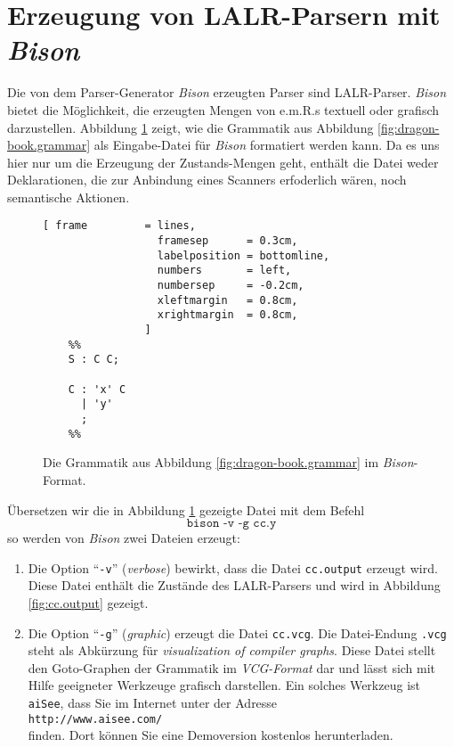 \section{Erzeugung von LALR-Parsern mit \textsl{Bison}}
Die von dem Parser-Generator \textsl{Bison} erzeugten Parser sind LALR-Parser.
\textsl{Bison} bietet die M\"oglichkeit, die erzeugten Mengen von e.m.R.s textuell oder
grafisch darzustellen.  Abbildung \ref{fig:cc.y} zeigt, wie die Grammatik aus Abbildung
\ref{fig:dragon-book.grammar} als Eingabe-Datei f\"ur \textsl{Bison} formatiert werden kann.
Da es uns hier nur um die Erzeugung der Zustands-Mengen geht, enth\"alt die Datei weder
Deklarationen, die zur Anbindung eines Scanners erfoderlich w\"aren, noch semantische Aktionen.

\begin{figure}[!ht]
\centering
\begin{Verbatim}[ frame         = lines, 
                  framesep      = 0.3cm, 
                  labelposition = bottomline,
                  numbers       = left,
                  numbersep     = -0.2cm,
                  xleftmargin   = 0.8cm,
                  xrightmargin  = 0.8cm,
                ]
    %%
    S : C C;
    
    C : 'x' C
      | 'y'
      ;     
    %%
\end{Verbatim}
\vspace*{-0.3cm}
\caption{Die Grammatik aus Abbildung \ref{fig:dragon-book.grammar} im \textsl{Bison}-Format.}
\label{fig:cc.y}
\end{figure}

\noindent
\"Ubersetzen wir die in Abbildung \ref{fig:cc.y} gezeigte Datei mit dem Befehl
\[ \texttt{bison -v -g cc.y} \]
so werden von \textsl{Bison} zwei Dateien erzeugt:
\begin{enumerate}
\item Die Option ``\texttt{-v}'' (\emph{verbose}) bewirkt, dass die Datei
      \texttt{cc.output} erzeugt wird.  Diese Datei enth\"alt die Zust\"ande des
      LALR-Parsers und wird in Abbildung \ref{fig:cc.output} gezeigt.
\item Die Option ``\texttt{-g}'' (\emph{graphic}) erzeugt die Datei
      \texttt{cc.vcg}.  Die Datei-Endung \texttt{.vcg} steht als Abk\"urzung f\"ur 
      \emph{visualization of compiler graphs}.
      Diese Datei stellt den Goto-Graphen der Grammatik im
      \emph{VCG-Format} dar und l\"asst sich mit Hilfe geeigneter Werkzeuge grafisch
      darstellen.  
      Ein solches Werkzeug ist \texttt{aiSee}, dass Sie im Internet unter der Adresse
      \\[0.2cm]
      \hspace*{1.3cm}
      \texttt{http://www.aisee.com/}
      \\[0.2cm]
      finden.  Dort k\"onnen Sie eine Demoversion kostenlos herunterladen.
\end{enumerate}

